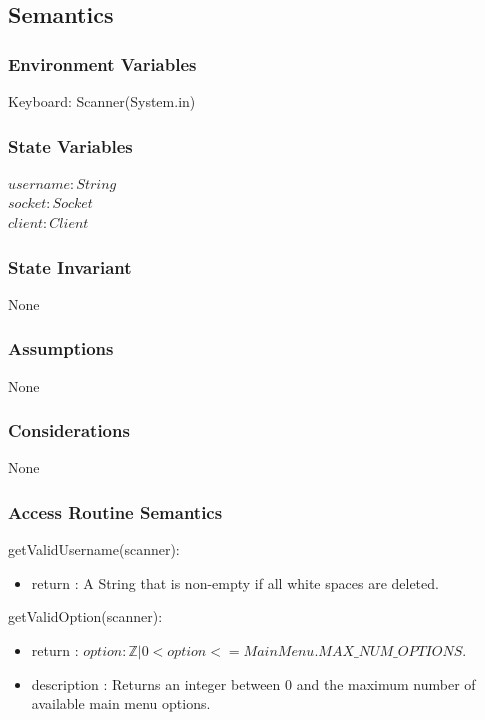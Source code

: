 \documentclass[12pt, titlepage]{article}
\begin{document}
    \subsection* {Semantics}
    
    \subsubsection* {Environment Variables}
        Keyboard: Scanner(System.in)
        
    \subsubsection* {State Variables}
        $\mathit{username}: String$\\
        $\mathit{socket}: Socket$\\
        $\mathit{client} : Client$\\
    
    \subsubsection* {State Invariant}
        None
    
    \subsubsection* {Assumptions}
        None
    
    \subsubsection* {Considerations}
        None
    
    \subsubsection* {Access Routine Semantics}
    
        \noindent getValidUsername(scanner):
        \begin{itemize}
        \item return : A String that is non-empty if all white spaces are deleted.
        \end{itemize}
        
        \noindent getValidOption(scanner):
        \begin{itemize}
        \item return : $option : \mathbb{Z} | 0 < option <= MainMenu.MAX\_NUM\_OPTIONS$. 
        \item description : Returns an integer between 0 and the maximum number of available main menu options.
        \end{itemize}
        
\end{document}
